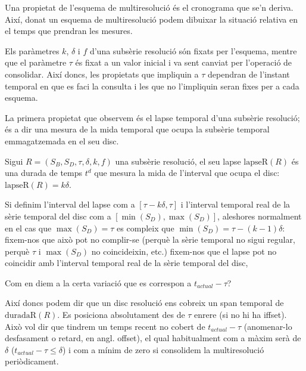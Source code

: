 Una propietat de l'esquema de multiresolució és el cronograma que se'n deriva. Així, donat un esquema de multiresolució podem dibuixar la situació relativa en el temps que prendran les mesures.


\todo{}

  
Els paràmetres $k$, $\delta$ i $f$ d'una subsèrie resolució són fixats
per l'esquema, mentre que el paràmetre $\tau$ és fixat a un valor
inicial i va sent canviat per l'operació de consolidar. Així doncs,
les propietats que impliquin a $\tau$ dependran de l'instant temporal
en que es faci la consulta i les que no l'impliquin seran fixes per a
cada esquema.



La primera propietat que observem és el lapse temporal d'una subsèrie
resolució; és a dir una mesura de la mida temporal que ocupa la
subsèrie temporal emmagatzemada en el seu disc.
\begin{definition} %
  Sigui $R=(S_B,S_D,\tau,\delta,k,f)$ una subsèrie resolució, el seu
  lapse $\text{lapseR}(R)$ és una durada de temps $t^d$ que mesura la
  mida de l'interval que ocupa el disc: $\text{lapseR}(R) = k\delta$.
\end{definition}

\todo{} Si definim l'interval del lapse com a $[\tau - k\delta, \tau]$
i l'interval temporal real de la sèrie temporal del disc com a
$[\min(S_D),\max(S_D)]$, aleshores normalment en el cas que $\max(S_D)=\tau$ es compleix que $\min(S_D)=\tau - (k-1)\delta $: fixem-nos que això pot no complir-se (perquè la sèrie temporal no sigui regular, perquè $\tau$ i $\max(S_D)$ no coincideixin, etc.)
 fixem-nos que el lapse pot no coincidir amb
l'interval temporal real de la sèrie temporal del disc,



Com en diem a la certa variació que es correspon a $t_{actual}-\tau$?





Així doncs podem dir que un disc resolució ens cobreix un span temporal de  $\text{duradaR}(R)$. Es posiciona absolutament des de $\tau$ enrere (si no hi ha iffset). Això vol dir que tindrem un temps recent no cobert de $t_{actual}-\tau$ (anomenar-lo desfasament o retard, en angl. offset), el qual habitualment com a màxim serà de $\delta$ ($t_{actual}-\tau \leq \delta$) i com a mínim de zero si consolidem la multiresolució periòdicament.






